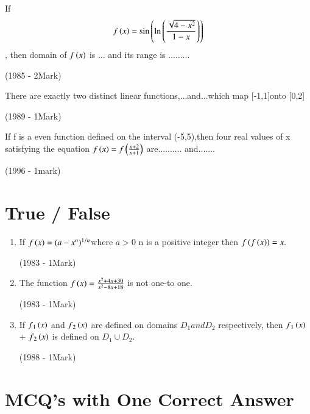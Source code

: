\documentclass[journal]{IEEEtran}
\begin{document}
\begin{enumerate}
{    
    \item If \begin{align*}  f\left(x\right) = \sin \left( \ln \left( \frac{\sqrt{4 - x^{2}}}{1 - x}\right)\right) \end{align*},  then domain of  $f\left(x\right)$ is ... and its range is .........
    
    
    \hfill
    {(1985 - 2Mark)}
    
     
    \item There are exactly two distinct linear functions,...and...which map [-1,1]onto [0,2]
    
    \hfill
    {(1989 - 1Mark)}
    
    
    
     \item If f is a even function defined on the 
    interval (-5,5),then four real values of x 
    satisfying the equation $f\left(x\right)=f\left({\frac{x+2}{x+1}}\right)$
    are.......... and.......
    
    
    \hfill   (1996 - 1mark)
    }
\end{enumerate}





\section{ True / False}




\begin{enumerate}

\item If  $f\left(x\right)=(a-x^n)^{1/n}$where $a>0$ n is a positive integer 
then $f\left(f\left(x\right)\right)=x.$


 \hfill 
 {(1983 - 1Mark)}


 
\item The function $f\left(x\right)={\frac{x^2+4x+30}{x^2-8x+18}}$ is not one-to one.


\hfill
{(1983 - 1Mark)}




\item If $f{_1}\left(x\right)$
 and  $f{_2}\left(x\right)$ are  defined on domains $D{_1} and D{_2}$ respectively, then $f{_1}\left(x\right)$ + $f{_2}\left(x\right)$ is defined on $D{_1}\cup D{_2}$.


\hfill
{(1988 - 1Mark)}
\end{enumerate}




\section{ MCQ's with One Correct Answer}
\end{document}
